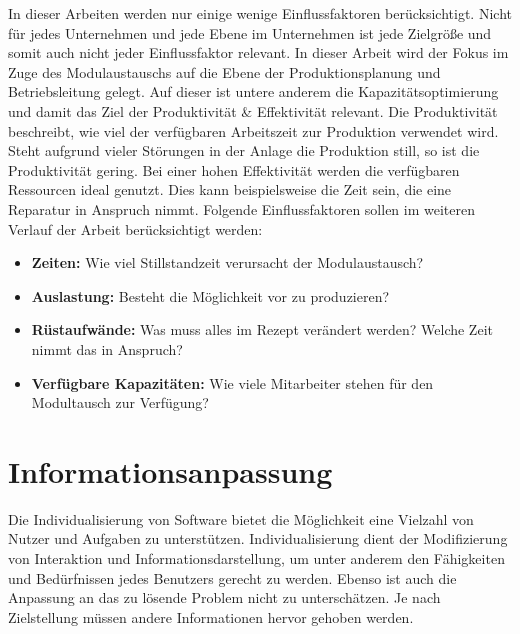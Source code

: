In dieser Arbeiten werden nur einige wenige Einflussfaktoren berücksichtigt. Nicht für jedes Unternehmen und jede Ebene im Unternehmen ist jede Zielgröße und somit auch nicht jeder Einflussfaktor relevant. In dieser Arbeit wird der Fokus im Zuge des Modulaustauschs auf die Ebene der Produktionsplanung und Betriebsleitung gelegt. Auf dieser ist untere anderem die Kapazitätsoptimierung und damit das Ziel der Produktivität \& Effektivität relevant. Die Produktivität beschreibt, wie viel der verfügbaren Arbeitszeit zur Produktion verwendet wird. Steht aufgrund vieler Störungen in der Anlage die Produktion still, so ist die Produktivität gering. Bei einer hohen Effektivität werden die verfügbaren Ressourcen ideal genutzt. Dies kann beispielsweise die Zeit sein, die eine Reparatur in Anspruch nimmt. Folgende Einflussfaktoren sollen im weiteren Verlauf der Arbeit berücksichtigt werden:
\begin{itemize}
\item \textbf{Zeiten:} Wie viel Stillstandzeit verursacht der Modulaustausch?
\item \textbf{Auslastung:} Besteht die Möglichkeit vor zu produzieren?
\item \textbf{Rüstaufwände:} Was muss alles im Rezept verändert werden? Welche Zeit nimmt das in Anspruch?
\item \textbf{Verfügbare Kapazitäten:} Wie viele Mitarbeiter stehen für den Modultausch zur Verfügung? 
\end{itemize}

\section{Informationsanpassung}
Die Individualisierung von Software bietet die Möglichkeit eine Vielzahl von Nutzer und Aufgaben zu unterstützen. Individualisierung dient der Modifizierung von Interaktion und Informationsdarstellung, um unter anderem den Fähigkeiten und Bedürfnissen jedes Benutzers gerecht zu werden. Ebenso ist auch die Anpassung an das zu lösende Problem nicht zu unterschätzen. Je nach Zielstellung müssen andere Informationen hervor gehoben werden.

